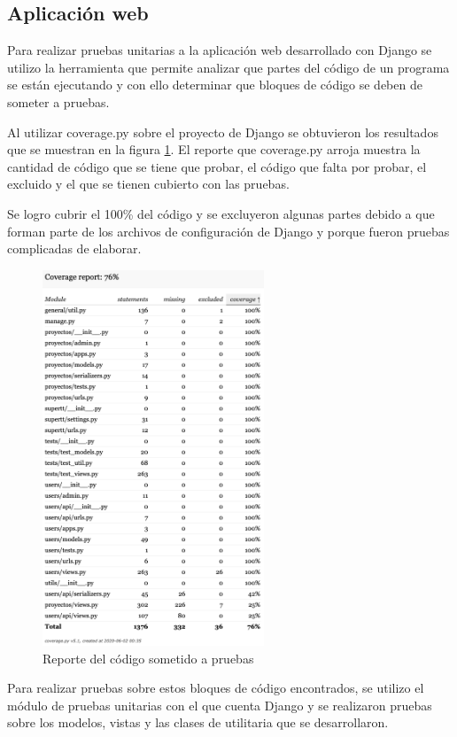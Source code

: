 \subsection{Aplicación web}

Para realizar pruebas unitarias a la aplicación web desarrollado con Django se utilizo la herramienta que permite analizar que partes del código de un programa se están ejecutando y con ello determinar que bloques de código se deben de someter a pruebas.

Al utilizar coverage.py sobre el proyecto de Django se obtuvieron los resultados que se muestran en la figura \ref{fig:coverage}. El reporte que coverage.py arroja muestra la cantidad de código que se tiene que probar, el código que falta por probar, el excluido y el que se tienen cubierto con las pruebas.

Se logro cubrir el 100\% del código y se excluyeron algunas partes debido a que forman parte de los archivos de configuración de Django y porque fueron pruebas complicadas de elaborar.

\begin{figure}[H]
	\centering
	\includegraphics[width=250px]{capitulo6/unitarias/img/coverage.png}
	\caption{Reporte del código sometido a pruebas}
	\label{fig:coverage}
\end{figure}

Para realizar pruebas sobre estos bloques de código encontrados, se utilizo el módulo de pruebas unitarias con el que cuenta Django y se realizaron pruebas sobre los modelos, vistas y las clases de utilitaria que se desarrollaron.

